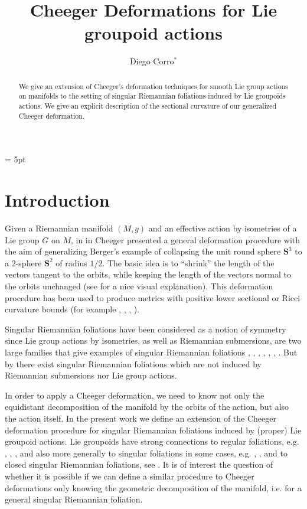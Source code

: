 \documentclass[12pt,a4paper,reqno]{amsart}
\title[Cheeger Deformations for Lie groupoid actions]{Cheeger Deformations for Lie groupoid actions}
\author[D.~Corro]{Diego Corro$^{\ast}$}
\newcommand{\1}{\mathbbm{1}} %
\newcommand{\Sp}{\mathbf{S}} %
\theoremstyle{definition}
\theoremstyle{TheoremNum}
\begin{document}
\overfullrule = 5pt

\begin{abstract}
We give an extension of Cheeger's deformation techniques for smo\-oth Lie group actions on manifolds  to the setting of singular Riemannian foliations induced by Lie groupo\-ids actions. We give an explicit description of the sectional curvature of our generalized Cheeger deformation.	
\end{abstract}

\maketitle


\section{Introduction}


Given a  Riemannian manifold $(M,g)$ and an effective action by isometries of a Lie group $G$ on $M$, in in \cite{Cheeger1973} Cheeger presented a general deformation procedure with the aim of generalizing Berger's example of collapsing the unit round sphere $\Sp^3$ to a $2$-sphere $\Sp^2$ of radius $1/2$. The basic idea is to ``shrink'' the length of the vectors tangent to the orbits, while keeping the length of the vectors normal to the orbits unchanged (see  \cite{MoullieWebpage} for a nice visual explanation). This deformation procedure has been used to produce metrics with positive lower sectional or Ricci curvature bounds (for example \cite{LawsonYau1972}, \cite{SearleSolorzanoWilhelm2015}, \cite{Searle2023}, \cite{CavenaghiESilvaSperanca2023}).

Singular Riemannian foliations have been considered as a notion of symmetry since Lie group actions by isometries, as well as Riemannian submersions, are two large families that give examples of singular Riemannian foliations \cite{Alexandrino}, \cite{Corro2019}, \cite{CorroMoreno2020},  \cite{GalazGarcia2015}, \cite{GeRadeschi2013}, \cite{Molino}, \cite{Moreno2019}. But by \cite{Radeschi2014} there exist singular Riemannian foliations which are not induced by Riemannian submersions nor Lie group actions. 

In order to apply a Cheeger deformation, we need to know not only the equidistant decomposition of the manifold by the orbits of the action, but also the action itself. In the present work we define an extension of the Cheeger deformation procedure for singular Riemannian foliations induced by (proper) Lie groupoid actions. Lie groupoids have strong connections to regular foliations, e.g. \cite{Moerdijk}, \cite{Ehresmann1965}, \cite{Winkelnkemper1983}, and also more generally to singular  foliations in some cases, e.g. \cite{Debord2001}, \cite{AndroulidakisSkandalis2009}, and to closed singular Riemannian foliations, see \cite{AlexandrinoInagakiStruchiner2018}. It is of interest the question of whether it is possible if we can define a similar procedure to Cheeger deformations only knowing the geometric decomposition of the manifold, i.e. for a general singular Riemannian foliation. 
\end{document}
